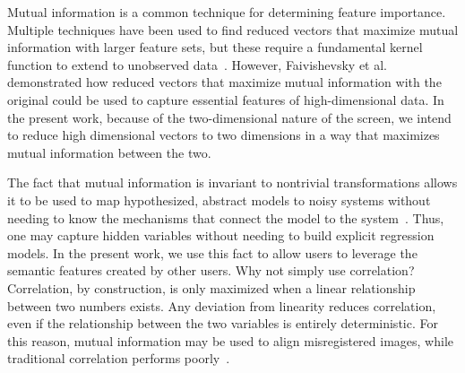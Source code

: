 \documentclass[journal]{vgtc}
\begin{document}
{Mutual information is a common technique for determining feature importance\cite{torkkola2003feature,faivishevsky2012dimensionality}. Multiple techniques have been used to find reduced vectors that maximize mutual information with larger feature sets, but these require a fundamental kernel function to extend to unobserved data~\cite{faivishevsky2012dimensionality}. However, Faivishevsky et al. demonstrated how reduced vectors that maximize mutual information with the original could be used to capture essential features of high-dimensional data.  In the present work, because of the two-dimensional nature of the screen, we intend to reduce high dimensional vectors to two dimensions in a way that maximizes mutual information between the two.

The fact that mutual information is invariant to nontrivial transformations allows it to be used to map hypothesized, abstract models to noisy systems without needing to know the mechanisms that connect the model to the system~\cite{kuo2008gene,dunleavy2015mutual}. Thus, one may capture hidden variables without needing to build explicit regression models.  In the present work, we use this fact to allow users to leverage the semantic features created by other users. Why not simply use correlation? Correlation, by construction, is only maximized when a linear relationship between two numbers exists. Any deviation from linearity reduces correlation, even if the relationship between the two variables is entirely deterministic. For this reason, mutual information may be used to align misregistered images, while traditional correlation performs poorly~\cite{kim1997mutual}. 
}
\end{document}
